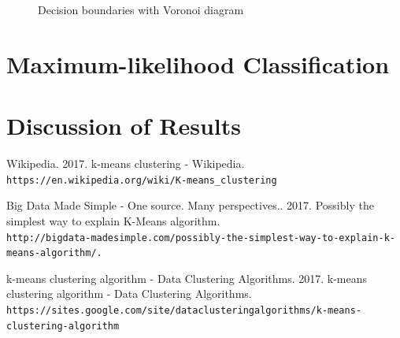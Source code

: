 \documentclass[a4paper, 11pt]{article}
\begin{document}
\captionsetup[subfigure]{labelformat=empty}
\begin{figure}[h!]
    \centering
    \qquad
    \caption{Decision boundaries with Voronoi diagram}%
\end{figure}


\section*{\vspace{-0.35cm}Maximum-likelihood Classification}

\section*{\vspace{-0.35cm}Discussion of Results}

\begin{thebibliography}{9}
     Wikipedia. 2017. k-means clustering - Wikipedia.
     \\\texttt{https://en.wikipedia.org/wiki/K-means\_clustering}
     
     Big Data Made Simple - One source. Many perspectives.. 2017. Possibly the simplest way to explain K-Means algorithm.
     \\\texttt{http://bigdata-madesimple.com/possibly-the-simplest-way-to-explain-k-means-algorithm/.}

     k-means clustering algorithm - Data Clustering Algorithms. 2017. k-means clustering algorithm - Data Clustering Algorithms. 
     \\\texttt{https://sites.google.com/site/dataclusteringalgorithms/k-means-clustering-algorithm}

\end{thebibliography}
\end{document}
